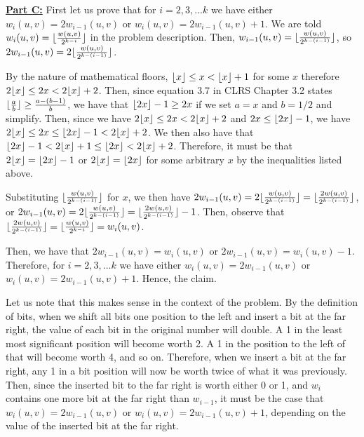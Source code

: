 \documentclass[11pt]{article}
\DeclarePairedDelimiter\floor{\lfloor}{\rfloor}
\begin{document}
\underline{\textbf{Part C:}} First let us prove that for $i=2,3,...k$ we have either $w_i(u,v) = 2w_{i-1}(u,v)$ or $w_i(u,v) = 2w_{i-1}(u,v) + 1$. We are told $w_i(u,v) = \floor{\frac{w(u,v)}{2^{k-i}}}$ in the problem description. Then, $w_{i-1}(u,v) = \floor{\frac{w(u,v)}{2^{k-(i-1)}}}$, so $2w_{i-1}(u,v) = 2\floor{\frac{w(u,v)}{2^{k-(i-1)}}}$.

By the nature of mathematical floors, $\floor{x} \leq x < \floor{x} + 1$ for some $x$ therefore $2\floor{x} \leq 2x < 2\floor{x} + 2$. Then, since equation 3.7 in CLRS Chapter 3.2 states $\floor{\frac{a}{b}} \geq \frac{a - (b-1)}{b}$, we have that $\floor{2x} - 1 \geq 2x$  if we set $a=x$ and $b=1/2$ and simplify. Then, since we have $2\floor{x} \leq 2x < 2\floor{x} + 2$ and $2x \leq \floor{2x} - 1$, we have $2\floor{x} \leq 2x \leq \floor{2x} - 1 < 2\floor{x} + 2$. We then also have that $\floor{2x} - 1 < 2\floor{x} + 1 \leq \floor{2x} < 2\floor{x} + 2$. Therefore, it must be that $2\floor{x} = \floor{2x} - 1$ or $2\floor{x} = \floor{2x}$ for some arbitrary $x$ by the inequalities listed above.

Substituting $\floor{\frac{w(u,v)}{2^{k-(i-1)}}}$ for $x$, we then have $2w_{i-1}(u,v) = 2  \floor{\frac{w(u,v)}{2^{k-(i-1)}}} = \floor{\frac{2w(u,v)}{2^{k-(i-1)}}}$, or $2w_{i-1}(u,v) = 2  \floor{\frac{w(u,v)}{2^{k-(i-1)}}} = \floor{\frac{2w(u,v)}{2^{k-(i-1)}}} - 1$. Then, observe that $\floor{\frac{2w(u,v)}{2^{k-(i-1)}}} = \floor{\frac{w(u,v)}{2^{k-i}}} = w_i(u,v)$.

Then, we have that $2w_{i-1}(u,v) = w_i(u,v)$ or $2w_{i-1}(u,v) = w_i(u,v) - 1$. Therefore, for $i=2,3,...k$ we have either $w_i(u,v) = 2w_{i-1}(u,v)$ or $w_i(u,v) = 2w_{i-1}(u,v) + 1$. Hence, the claim.

Let us note that this makes sense in the context of the problem. By the definition of bits, when we shift all bits one position to the left and insert a bit at the far right, the value of each bit in the original number will double. A 1 in the least most significant position will become worth 2. A 1 in the position to the left of that will become worth 4, and so on. Therefore, when we insert a bit at the far right, any 1 in a bit position will now be worth twice of what it was previously. Then, since the inserted bit to the far right is worth either 0 or 1, and $w_{i}$ contains one more bit at the far right than $w_{i-1}$, it must be the case that $w_i(u,v) = 2w_{i-1}(u,v)$ or $w_i(u,v) = 2w_{i-1}(u,v) + 1$, depending on the value of the inserted bit at the far right.\\
\end{document}
